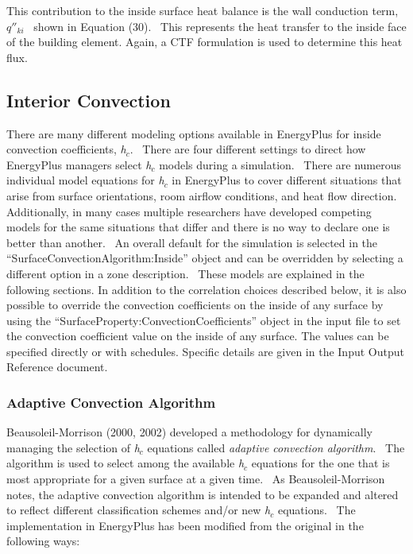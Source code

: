 This contribution to the inside surface heat balance is the wall conduction term, \({q''_{ki}}\) ~shown in Equation (30).~ This represents the heat transfer to the inside face of the building element. Again, a CTF formulation is used to determine this heat flux.

\subsection{Interior Convection}\label{interior-convection}

There are many different modeling options available in EnergyPlus for inside convection coefficients, \emph{h\(_{c}\)}.~ There are four different settings to direct how EnergyPlus managers select \emph{h\(_{c}\)} models during a simulation.~ There are numerous individual model equations for \emph{h\(_{c}\)} in EnergyPlus to cover different situations that arise from surface orientations, room airflow conditions, and heat flow direction.~ Additionally, in many cases multiple researchers have developed competing models for the same situations that differ and there is no way to declare one is better than another.~ An overall default for the simulation is selected in the ``SurfaceConvectionAlgorithm:Inside'' object and can be overridden by selecting a different option in a zone description.~ These models are explained in the following sections. In addition to the correlation choices described below, it is also possible to override the convection coefficients on the inside of any surface by using the ``SurfaceProperty:ConvectionCoefficients'' object in the input file to set the convection coefficient value on the inside of any surface. The values can be specified directly or with schedules. Specific details are given in the Input Output Reference document.

\subsubsection{Adaptive Convection Algorithm}\label{adaptive-convection-algorithm}

Beausoleil-Morrison (2000, 2002) developed a methodology for dynamically managing the selection of \emph{h\(_{c}\)} equations called \emph{adaptive convection algorithm}.~ The algorithm is used to select among the available \emph{h\(_{c}\)} equations for the one that is most appropriate for a given surface at a given time.~ As Beausoleil-Morrison notes, the adaptive convection algorithm is intended to be expanded and altered to reflect different classification schemes and/or new \emph{h\(_{c}\)} equations.~ The implementation in EnergyPlus has been modified from the original in the following ways:

